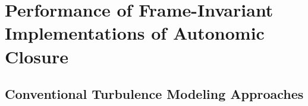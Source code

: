 \graphicspath{ {./Ch10/}  } 

\chapter{Performance of Frame-Invariant Implementations of Autonomic Closure}

\lipsum[1] 

\section{Conventional Turbulence Modeling Approaches} 

\lipsum[2] 

